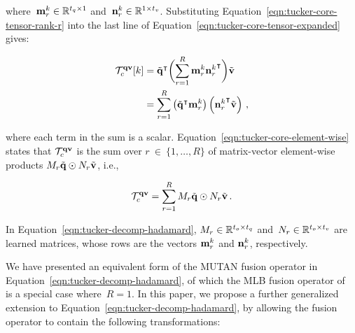 \noindent where~$\mathbf{m}_r^k \in \mathbb{R}^{t_q \times 1}$ and~$\mathbf{n}_r^k \in \mathbb{R}^{1 \times t_v}$.
Substituting Equation~\ref{eqn:tucker-core-tensor-rank-r} into the last line of
Equation~\ref{eqn:tucker-core-tensor-expanded} gives:

\begin{align}
\begin{split}
        \mathcal{T}_c^{\mathbf{q}\mathbf{v}}[k] &= {\tilde{\mathbf{q}}}^\intercal
                \biggl(\sum_{r = 1}^R \mathbf{m}_r^k {\mathbf{n}_r^k}^\intercal\biggr) \tilde{\mathbf{v}}  \\
                     &= \sum_{r = 1}^R \left({\tilde{\mathbf{q}}}^\intercal \mathbf{m}_r^k\right)
                                \left({\mathbf{n}_r^k}^\intercal \tilde{\mathbf{v}}\right) \,,
\end{split}
\label{eqn:tucker-core-element-wise}
\end{align}

\noindent where each term in the sum is a scalar.
Equation~\ref{eqn:tucker-core-element-wise} states that $\mathcal{T}_c^{\mathbf{q}{}\mathbf{v}{}}$ is the sum
over $r~\in~\{1, \dots, R\}$ of matrix-vector element-wise products
$M_r \tilde{\mathbf{q}} \odot N_r \tilde{\mathbf{v}}$, i.e.,

\begin{equation}
        \mathcal{T}_c^{\mathbf{q}{}\mathbf{v}{}} =
                \sum_{r = 1}^R M_r \tilde{\mathbf{q}} \odot N_r \tilde{\mathbf{v}} \,.
\label{eqn:tucker-decomp-hadamard}
\end{equation}

\noindent In Equation~\ref{eqn:tucker-decomp-hadamard}, $M_r \in \mathbb{R}^{t_o \times t_q}$
and~$N_r \in \mathbb{R}^{t_o \times t_v}$ are learned matrices, whose rows are the
vectors $\mathbf{m}_r^k$ and $\mathbf{n}_r^k$, respectively.

We have presented an equivalent form of the MUTAN fusion operator in
Equation~\ref{eqn:tucker-decomp-hadamard}, of which the MLB fusion operator
of~\cite{Kim2017} is a special case where~$R = 1$. In this paper, we propose a
further generalized extension to Equation~\ref{eqn:tucker-decomp-hadamard}, by
allowing the fusion operator to contain the following transformations:

